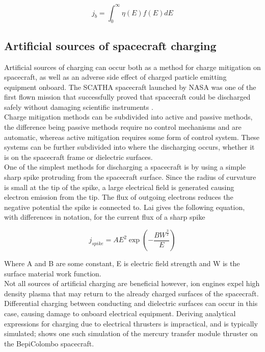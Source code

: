 \begin{equation}\label{eq:backscatterE}
    j_b = \int^{\infty}_0 \eta(E) f(E) dE
\end{equation}

\subsection*{Artificial sources of spacecraft charging}
Artificial sources of charging can occur both as a method for charge mitigation on spacecraft, as well as an adverse side effect of charged particle emitting equipment onboard. The SCATHA spacecraft launched by NASA was one of the first flown mission that successfully proved that spacecraft could be discharged safely without damaging scientific instruments . 
\\
Charge mitigation methods can be subdivided into active and passive methods, the difference being passive methods require no control mechanisms and are automatic, whereas active mitigation requires some form of control system. These systems can be further subdivided into where the discharging occurs, whether it is on the spacecraft frame or dielectric surfaces.
\\
One of the simplest methods for discharging a spacecraft is by using a simple sharp spike protruding from the spacecraft surface. Since the radius of curvature is small at the tip of the spike, a large electrical field is generated causing electron emission from the tip. The flux of outgoing electrons reduces the negative potential the spike is connected to. Lai  gives the following equation, with differences in notation, for the current flux of a sharp spike 

\begin{equation}
    j_{spike} = A E^2 \exp \left(- \frac{B W^{\frac{3}{2}}}{E} \right)
\end{equation}

Where A and B are some constant, E is electric field strength and W is the surface material work function.
\\
Not all sources of artificial charging are beneficial however, ion engines expel high density plasma that may return to the already charged surfaces of the spacecraft. Differential charging between conducting and dielectric surfaces can occur in this case, causing damage to onboard electrical equipment. Deriving analytical expressions for charging due to electrical thrusters is impractical, and is typically simulated;  shows one such simulation of the mercury transfer module thruster on the BepiColombo spacecraft. 